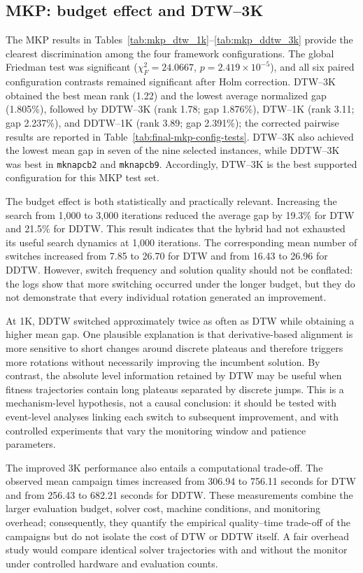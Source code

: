 \documentclass[review]{elsarticle}
\begin{document}
\subsection{MKP: budget effect and DTW--3K}
\label{sec:discussion-mkp}

The MKP results in Tables~\ref{tab:mkp_dtw_1k}--\ref{tab:mkp_ddtw_3k}
provide the clearest discrimination among the four framework configurations.
The global Friedman test was significant
($\chi_F^2=24.0667$, $p=2.419\times10^{-5}$), and all six paired configuration
contrasts remained significant after Holm correction. DTW--3K obtained the
best mean rank (1.22) and the lowest average normalized gap (1.805\%), followed
by DDTW--3K (rank 1.78; gap 1.876\%), DTW--1K (rank 3.11; gap 2.237\%), and
DDTW--1K (rank 3.89; gap 2.391\%); the corrected pairwise results are reported
in Table~\ref{tab:final-mkp-config-tests}. DTW--3K also achieved the lowest mean gap in
seven of the nine selected instances, while DDTW--3K was best in
\texttt{mknapcb2} and \texttt{mknapcb9}. Accordingly, DTW--3K is the best
supported configuration for this MKP test set.

The budget effect is both statistically and practically relevant. Increasing
the search from 1,000 to 3,000 iterations reduced the average gap by 19.3\% for
DTW and 21.5\% for DDTW. This result indicates that the hybrid had not exhausted
its useful search dynamics at 1,000 iterations. The corresponding mean number
of switches increased from 7.85 to 26.70 for DTW and from 16.43 to 26.96 for
DDTW. However, switch frequency and solution quality should not be conflated:
the logs show that more switching occurred under the longer budget, but they do
not demonstrate that every individual rotation generated an improvement.

At 1K, DDTW switched approximately twice as often as DTW while obtaining a
higher mean gap. One plausible explanation is that derivative-based alignment
is more sensitive to short changes around discrete plateaus and therefore
triggers more rotations without necessarily improving the incumbent solution.
By contrast, the absolute level information retained by DTW may be useful when
fitness trajectories contain long plateaus separated by discrete jumps. This
is a mechanism-level hypothesis, not a causal conclusion: it should be tested
with event-level analyses linking each switch to subsequent improvement, and
with controlled experiments that vary the monitoring window and patience
parameters.

The improved 3K performance also entails a computational trade-off. The
observed mean campaign times increased from 306.94 to 756.11 seconds for DTW
and from 256.43 to 682.21 seconds for DDTW. These measurements combine the
larger evaluation budget, solver cost, machine conditions, and monitoring
overhead; consequently, they quantify the empirical quality--time trade-off of
the campaigns but do not isolate the cost of DTW or DDTW itself. A fair overhead
study would compare identical solver trajectories with and without the monitor
under controlled hardware and evaluation counts.
\end{document}
